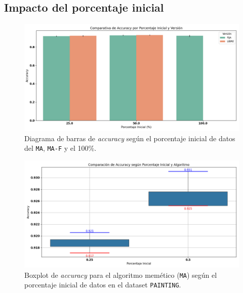 \subsection{Impacto del porcentaje inicial}
\begin{figure}[htp]
    \centering
    \includegraphics[width=1\textwidth]{imagenes/evaluaciones/painting/comparacion-por-porcentaje}
    \caption{Diagrama de barras de \textit{accuracy} según el porcentaje inicial de datos del \texttt{MA}, \texttt{MA-F} y el 100\%.}
    \label{fig:accuracy_porcentaje_painting}
\end{figure}

\begin{figure}[htp]
    \centering
    \includegraphics[width=1\textwidth]{imagenes/evaluaciones/painting/comparacion-por-porcentaje-mem}
    \caption{Boxplot de \textit{accuracy} para el algoritmo memético (\texttt{MA}) según el porcentaje inicial de datos en el dataset \texttt{PAINTING}.}
    \label{fig:comparacion-por-porcentaje-mem}
\end{figure}

